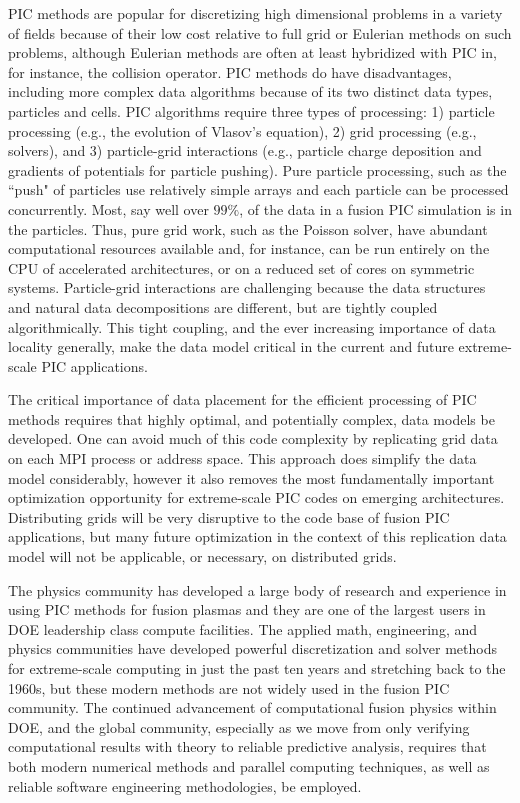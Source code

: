 \documentclass[review]{siamart}
\begin{document}
PIC methods are popular for discretizing high dimensional problems in a variety of fields because of their low cost relative to full grid or Eulerian methods on such problems, although Eulerian methods are often at least hybridized with PIC in, for instance, the collision operator.
PIC methods do have disadvantages, including more complex data algorithms because of its two distinct data types, particles and cells.
PIC algorithms require three types of processing: 1) particle processing (e.g., the evolution of Vlasov's equation), 2) grid processing (e.g., solvers), and 3) particle-grid interactions (e.g., particle charge deposition and gradients of potentials for particle pushing).
Pure particle processing, such as the ``push" of particles use relatively simple arrays and each particle can be processed concurrently.
Most, say well over $99\%$, of the data in a fusion PIC simulation is in the particles.
Thus, pure grid work, such as the Poisson solver, have abundant computational resources available and, for instance, can be run entirely on the CPU of accelerated architectures, or on a reduced set of cores on symmetric systems.
Particle-grid interactions are challenging because the data structures and natural data decompositions are different, but are tightly coupled algorithmically.
This tight coupling, and the ever increasing importance of data locality generally, make the data model critical in the current and future extreme-scale PIC applications.

The critical importance of data placement for the efficient processing of PIC methods requires that highly optimal, and potentially complex, data models be developed.
One can avoid much of this code complexity by replicating grid data on each MPI process or address space.
This approach does simplify the data model considerably, however it also removes the most fundamentally important optimization opportunity for extreme-scale PIC codes on emerging architectures.
Distributing grids will be very disruptive to the code base of fusion PIC applications, but many future optimization in the context of this replication data model will not be applicable, or necessary, on distributed grids.

The physics community has developed a large body of research and experience in using PIC methods for fusion plasmas and they are one of the largest users in DOE leadership class compute facilities.
The applied math, engineering, and physics communities have developed powerful discretization and solver methods for extreme-scale computing in just the past ten years and stretching back to the 1960s, but these modern methods are not widely used in the fusion PIC community.
The continued advancement of computational fusion physics within DOE, and the global community, especially as we move from only verifying computational results with theory to reliable predictive analysis, requires that both modern numerical methods and parallel computing techniques, as well as reliable software engineering methodologies, be employed.
\end{document}
